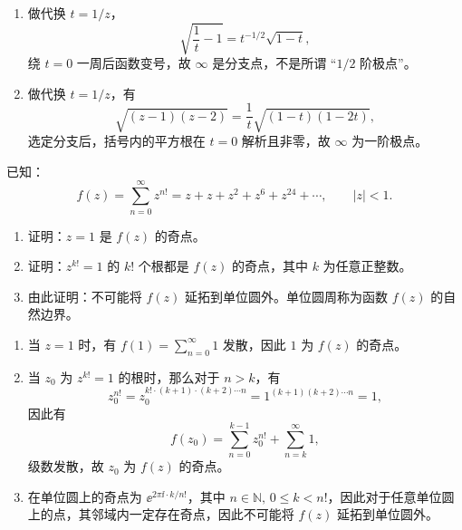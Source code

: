 \begin{question}
\begin{solution}
\begin{enumerate}
  \item 做代换 \(t=1/z\)，
   \[
   \sqrt{\frac{1}{t}-1} = t^{-1/2}\sqrt{1-t},
   \]
   绕 \(t=0\) 一周后函数变号，故 \(\infty\) 是分支点，不是所谓
   “\(1/2\) 阶极点”。

  \item 做代换 \(t=1/z\)，有
   \[
   \sqrt{(z-1)(z-2)} = \frac{1}{t}\sqrt{(1-t)(1-2t)},
   \]
   选定分支后，括号内的平方根在 \(t=0\) 解析且非零，故
   \(\infty\) 为一阶极点。
\end{enumerate}
\end{solution}
\end{question}

\begin{question}
已知：
\[
f(z)=\sum_{n=0}^\infty z^{n!}=z+z+z^2+z^6+z^{24}+\cdots,\qquad |z|<1.
\]
\begin{enumerate}
  \item 证明：\(z=1\) 是 \(f(z)\) 的奇点。
  \item 证明：\(z^{k!}=1\) 的 \(k!\) 个根都是 \(f(z)\) 的奇点，其中 \(k\) 为任意正整数。
  \item 由此证明：不可能将 \(f(z)\) 延拓到单位圆外。单位圆周称为函数 \(f(z)\) 的自然边界。
\end{enumerate}

\begin{solution}
\begin{enumerate}
  \item 当 \(z=1\) 时，有 \(f(1)=\displaystyle\sum_{n=0}^\infty 1\) 发散，因此 \(1\) 为 \(f(z)\) 的奇点。

  \item 当 \(z_0\) 为 \(z^{k!}=1\) 的根时，那么对于 \(n>k\)，有
   \[
   z_0^{n!} = z_0^{k!\cdot (k+1)\cdot (k+2)\cdots n} = 1^{(k+1)(k+2)\cdots n} = 1,
   \]
   因此有
   \[
   f(z_0) = \sum_{n=0}^{k-1} z_0^{n!} + \sum_{n=k}^\infty 1,
   \]
   级数发散，故 \(z_0\) 为 \(f(z)\) 的奇点。

  \item 在单位圆上的奇点为 \(\ee^{2\pi \ii \cdot k/n!}\)，其中 \(n\in\mathbb{N},\,0\le k<n!\)，因此对于任意单位圆上的点，其邻域内一定存在奇点，因此不可能将 \(f(z)\) 延拓到单位圆外。
\end{enumerate}
\end{solution}
\end{question}

